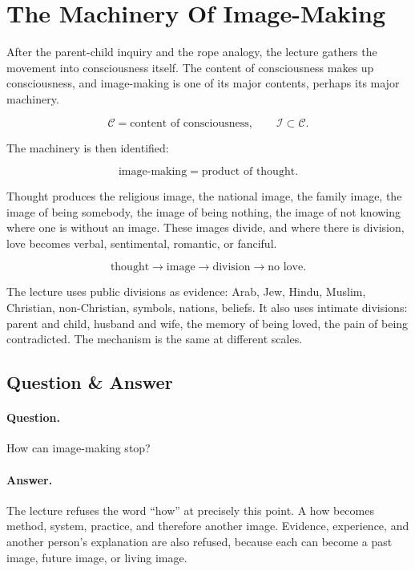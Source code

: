 \documentclass[11pt,oneside]{book}
\begin{document}
\section{The Machinery Of Image-Making}

After the parent-child inquiry and the rope analogy, the lecture gathers the movement into consciousness itself. The content of consciousness makes up consciousness, and image-making is one of its major contents, perhaps its major machinery.

\begin{equation}
\mathcal{C}=\text{content of consciousness},
\qquad
\mathcal{I}\subset \mathcal{C}.
\end{equation}

The machinery is then identified:

\begin{equation}
\text{image-making}=\text{product of thought}.
\end{equation}

Thought produces the religious image, the national image, the family image, the image of being somebody, the image of being nothing, the image of not knowing where one is without an image. These images divide, and where there is division, love becomes verbal, sentimental, romantic, or fanciful.

\begin{equation}
\text{thought}
\longrightarrow
\text{image}
\longrightarrow
\text{division}
\longrightarrow
\text{no love}.
\end{equation}

The lecture uses public divisions as evidence: Arab, Jew, Hindu, Muslim, Christian, non-Christian, symbols, nations, beliefs. It also uses intimate divisions: parent and child, husband and wife, the memory of being loved, the pain of being contradicted. The mechanism is the same at different scales.

\subsection{Question \& Answer}

\paragraph{Question.}
How can image-making stop?

\paragraph{Answer.}
The lecture refuses the word ``how'' at precisely this point. A how becomes method, system, practice, and therefore another image. Evidence, experience, and another person's explanation are also refused, because each can become a past image, future image, or living image.
\end{document}
